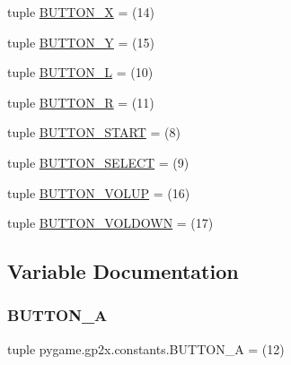 \begin{DoxyCompactItemize}
tuple \hyperlink{namespacepygame_1_1gp2x_1_1constants_afdb56edb200b89ed4229515fb47ddf90}{B\+U\+T\+T\+O\+N\+\_\+X} = (14)
\item 
tuple \hyperlink{namespacepygame_1_1gp2x_1_1constants_a4823b41266d194b0eefa1dae17e3d6ee}{B\+U\+T\+T\+O\+N\+\_\+Y} = (15)
\item 
tuple \hyperlink{namespacepygame_1_1gp2x_1_1constants_a2d42d4d811fd90301ba318f3906756f6}{B\+U\+T\+T\+O\+N\+\_\+L} = (10)
\item 
tuple \hyperlink{namespacepygame_1_1gp2x_1_1constants_ac04dfb7f536c084a06389d8253e6142e}{B\+U\+T\+T\+O\+N\+\_\+R} = (11)
\item 
tuple \hyperlink{namespacepygame_1_1gp2x_1_1constants_af4d86c11715971ce7c6a3fead8414599}{B\+U\+T\+T\+O\+N\+\_\+\+S\+T\+A\+RT} = (8)
\item 
tuple \hyperlink{namespacepygame_1_1gp2x_1_1constants_a3b1c180c3831aad12d8aadc293b76799}{B\+U\+T\+T\+O\+N\+\_\+\+S\+E\+L\+E\+CT} = (9)
\item 
tuple \hyperlink{namespacepygame_1_1gp2x_1_1constants_a9c64d274bd6f75ea153ad2b27ff457c4}{B\+U\+T\+T\+O\+N\+\_\+\+V\+O\+L\+UP} = (16)
\item 
tuple \hyperlink{namespacepygame_1_1gp2x_1_1constants_a38ba002a15d9313140da4c6fafa8deea}{B\+U\+T\+T\+O\+N\+\_\+\+V\+O\+L\+D\+O\+WN} = (17)
\end{DoxyCompactItemize}


\subsection{Variable Documentation}
\mbox{\label{namespacepygame_1_1gp2x_1_1constants_ab856932fffeaa4006398f0e8d58c1702}} 
\subsubsection{\texorpdfstring{B\+U\+T\+T\+O\+N\+\_\+A}{BUTTON\_A}}
{\footnotesize\ttfamily tuple pygame.\+gp2x.\+constants.\+B\+U\+T\+T\+O\+N\+\_\+A = (12)}

\mbox{\label{namespacepygame_1_1gp2x_1_1constants_a8a3904fa1cc045b26c83cffc3cc601c9}} 
